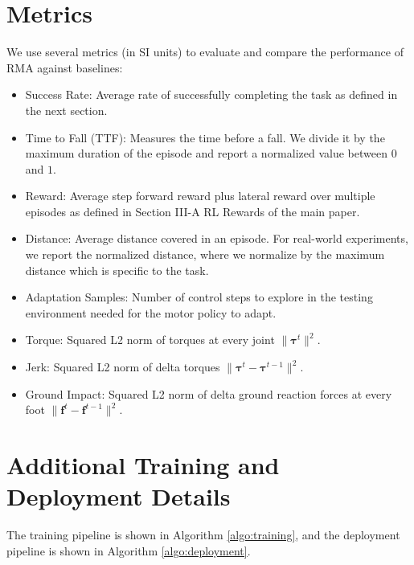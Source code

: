 \section{Metrics}
\label{sec:metrics}
We use several metrics (in SI units) to evaluate and compare the performance of RMA against baselines:
\begin{itemize}
    \item Success Rate: Average rate of successfully completing the task as defined in the next section. 
    \item Time to Fall (TTF): Measures the time before a fall. We divide it by the maximum duration of the episode and report a normalized value between $0$ and $1$.
    \item Reward: Average step forward reward plus lateral reward over multiple episodes as defined in Section III-A RL Rewards of the main paper. 
    \item Distance: Average distance covered in an episode. For real-world experiments, we report the normalized distance, where we normalize by the maximum distance which is specific to the task.
    \item Adaptation Samples: Number of control steps to explore in the testing environment needed for the motor policy to adapt.
    \item Torque: Squared L2 norm of torques at every joint $\| \bm{\tau}^{t} \|^2$.
    \item Jerk: Squared L2 norm of delta torques $\| \bm{\tau}^{t} - \bm{\tau}^{t-1} \|^2$.
    \item Ground Impact: Squared L2 norm of delta ground reaction forces at every foot $\|\mathbf{f}^t - \mathbf{f}^{t-1}\|^2$. 
\end{itemize}



\section{Additional Training and Deployment Details}
The training pipeline is shown in Algorithm \ref{algo:training}, and the deployment pipeline is shown in Algorithm \ref{algo:deployment}.

